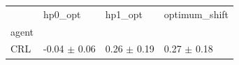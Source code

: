 \begin{tabular}{llll}
\toprule
 & hp0_opt & hp1_opt & optimum_shift \\
agent &  &  &  \\
\midrule
CRL & -0.04 $\pm$ 0.06 & 0.26 $\pm$ 0.19 & 0.27 $\pm$ 0.18 \\
\bottomrule
\end{tabular}
